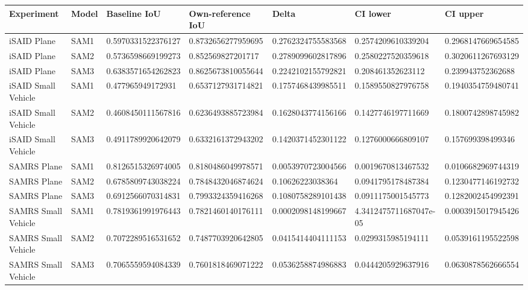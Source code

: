 \begin{tabular}{lllllll}
\toprule
Experiment & Model & Baseline IoU & Own-reference IoU & Delta & CI lower & CI upper \\
\midrule
iSAID Plane & SAM1 & 0.5970331522376127 & 0.8732656277959695 & 0.2762324755583568 & 0.2574209610339204 & 0.2968147669654585 \\
iSAID Plane & SAM2 & 0.5736598669199273 & 0.852569827201717 & 0.2789099602817896 & 0.2580227520359618 & 0.3020611267693129 \\
iSAID Plane & SAM3 & 0.6383571654262823 & 0.8625673810055644 & 0.2242102155792821 & 0.208461352623112 & 0.239943752362688 \\
iSAID Small Vehicle & SAM1 & 0.477965949172931 & 0.6537127931714821 & 0.1757468439985511 & 0.1589550827976758 & 0.1940354759480741 \\
iSAID Small Vehicle & SAM2 & 0.4608450111567816 & 0.6236493885723984 & 0.1628043774156166 & 0.1427746197711669 & 0.1800742898745982 \\
iSAID Small Vehicle & SAM3 & 0.4911789920642079 & 0.6332161372943202 & 0.1420371452301122 & 0.1276000666809107 & 0.157699398499346 \\
SAMRS Plane & SAM1 & 0.8126515326974005 & 0.8180486049978571 & 0.0053970723004566 & 0.0019670813467532 & 0.0106682969744319 \\
SAMRS Plane & SAM2 & 0.6785809743038224 & 0.7848432046874624 & 0.10626223038364 & 0.0941795178487384 & 0.1230477146192732 \\
SAMRS Plane & SAM3 & 0.6912566070314831 & 0.7993324359416268 & 0.1080758289101438 & 0.0911175001545773 & 0.1282002454992391 \\
SAMRS Small Vehicle & SAM1 & 0.7819361991976443 & 0.7821460140176111 & 0.0002098148199667 & 4.3412475711687047e-05 & 0.0003915017945426 \\
SAMRS Small Vehicle & SAM2 & 0.7072289516531652 & 0.7487703920642805 & 0.0415414404111153 & 0.0299315985194111 & 0.0539161195522598 \\
SAMRS Small Vehicle & SAM3 & 0.7065559594084339 & 0.7601818469071222 & 0.0536258874986883 & 0.0444205929637916 & 0.0630878562666554 \\
\bottomrule
\end{tabular}
